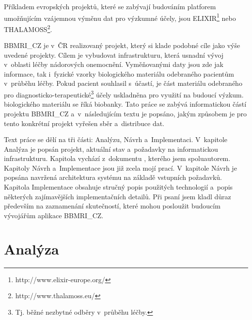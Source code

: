 \documentclass[11pt, final, oneside]{fithesis2}
\newcommand{\ProjectName}{\mbox{BBMRI\_CZ}\xspace}
\begin{document}
Příkladem evropských projektů, které se zabývají budováním platforem umožňujícím vzájemnou výměnu dat pro výzkumné účely, jsou ELIXIR\footnote{http://www.elixir-europe.org/} nebo THALAMOSS\footnote{http://www.thalamoss.eu/}. 

\ProjectName je v~ČR realizovaný projekt, který si klade podobné cíle jako výše uvedené projekty. Cílem je vybudovat infrastrukturu, která usnadní vývoj v~oblasti léčby nádorových onemocnění. Vyměňovanými daty jsou zde jak informace, tak i~fyzické vzorky biologického materiálu odebraného pacientům v~průběhu léčby. Pokud pacient souhlasil s~účastí, je část materiálu odebraného pro diagnosticko-terapeutické\footnote{Tj. běžné nezbytné odběry v~průběhu léčby.} účely uskladněna pro využití na budoucí výzkum.  biologického materiálu se říká biobanky. 
Tato práce se zabývá informatickou částí projektu \ProjectName a~v~následujícím textu je popsáno, jakým způsobem je pro tento konkrétní projekt vyřešen sběr a~distribuce dat. 

Text práce se dělí na tři části: Analýzu, Návrh a~Implementaci. V~kapitole Analýza je popsán projekt, aktuální stav a~požadavky na informatickou infrastrukturu. Kapitola vychází z~dokumentu \cite{ARCH_2014_1_25}, kterého jsem spoluautorem. Kapitoly Návrh a~Implementace jsou již zcela mojí prací. V~kapitole Návrh je popsána navržená architektura systému na základě vstupních požadavků. Kapitola Implementace obsahuje stručný popis použitých technologií a~popis některých zajímavějších implementačních detailů. Při psaní jsem kladl důraz především na zaznamenání skutečností, které mohou posloužit budoucím vývojářům aplikace \ProjectName.

\chapter{Analýza}\label{chapter:analysis}

\end{document}
